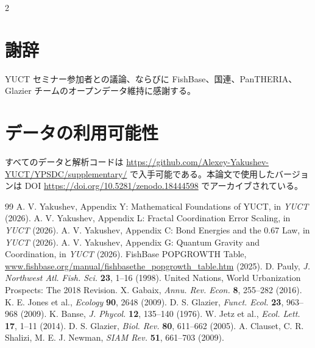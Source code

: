 \documentclass[11pt,a4paper]{article}
\begin{document}
\begin{multicols}{2}
		\section*{謝辞}
		
		YUCT セミナー参加者との議論、ならびに FishBase、国連、PanTHERIA、Glazier チームのオープンデータ維持に感謝する。
		
		\section*{データの利用可能性}
		
		すべてのデータと解析コードは \url{https://github.com/Alexey-Yakushev-YUCT/YPSDC/supplementary/} で入手可能である。本論文で使用したバージョンは DOI \url{https://doi.org/10.5281/zenodo.18444598} でアーカイブされている。
		
		\begin{thebibliography}{99}
			 A. V. Yakushev, Appendix Y: Mathematical Foundations of YUCT, in \emph{YUCT} (2026).
			 A. V. Yakushev, Appendix L: Fractal Coordination Error Scaling, in \emph{YUCT} (2026).
			 A. V. Yakushev, Appendix C: Bond Energies and the 0.67 Law, in \emph{YUCT} (2026).
			 A. V. Yakushev, Appendix G: Quantum Gravity and Coordination, in \emph{YUCT} (2026).
			 FishBase POPGROWTH Table, \url{www.fishbase.org/manual/fishbasethe_popgrowth_table.htm} (2025).
			 D. Pauly, \emph{J. Northwest Atl. Fish. Sci.} \textbf{23}, 1–16 (1998).
			 United Nations, World Urbanization Prospects: The 2018 Revision.
			 X. Gabaix, \emph{Annu. Rev. Econ.} \textbf{8}, 255–282 (2016).
			 K. E. Jones et al., \emph{Ecology} \textbf{90}, 2648 (2009).
			 D. S. Glazier, \emph{Funct. Ecol.} \textbf{23}, 963–968 (2009).
			 K. Banse, \emph{J. Phycol.} \textbf{12}, 135–140 (1976).
			 W. Jetz et al., \emph{Ecol. Lett.} \textbf{17}, 1–11 (2014).
			 D. S. Glazier, \emph{Biol. Rev.} \textbf{80}, 611–662 (2005).
			 A. Clauset, C. R. Shalizi, M. E. J. Newman, \emph{SIAM Rev.} \textbf{51}, 661–703 (2009).
		\end{thebibliography}
		
	\end{multicols}
\end{document}
